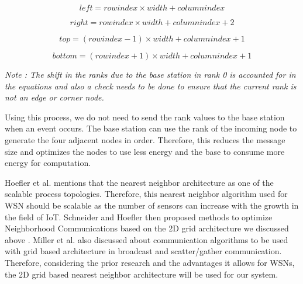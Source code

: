 \documentclass[conference]{IEEEtran}
\begin{document}
	\begin{equation}
	left = row index \times width + column index
	\label{left}
	\end{equation}
	
	\begin{equation}
	right = row index\times width + column index + 2
	\label{right}
	\end{equation}
	
	\begin{equation}
	top = (row index - 1) \times width + column index + 1
	\label{top}
	\end{equation}
	
	
	\begin{equation}
	bottom = (row index + 1) \times width + column index + 1
	\label{bottom}
	\end{equation}
	
	\textit{Note :  The shift in the ranks due to the base station in rank 0 is accounted for in the equations and also a check needs to be done to ensure that the current rank is not an edge or corner node.} 
	
	Using this process, we do not need to send the rank values to the base station when an event occurs. The base station can use the rank of the incoming node to generate the four adjacent nodes in order. Therefore, this reduces the message size and optimizes the nodes to use less energy and the base to consume more energy for computation.
	
	Hoefler et al. \cite{hoefler2011scalable} mentions that the nearest neighbor architecture as one of the scalable process topologies. Therefore, this nearest neighbor algorithm used for WSN should be scalable as the number of sensors can increase with the growth in the field of IoT. Schneider and Hoefler then proposed methods to optimize Neighborhood Communications based on the 2D grid architecture we discussed above \cite{hoefler2012optimization}. Miller et al. \cite{miller1996parallel} also discussed about communication algorithms to be used with grid based architecture in broadcast and scatter/gather communication. Therefore, considering the prior research and the advantages it allows for WSNs, the 2D grid based nearest neighbor architecture will be used for our system.
	
\end{document}
